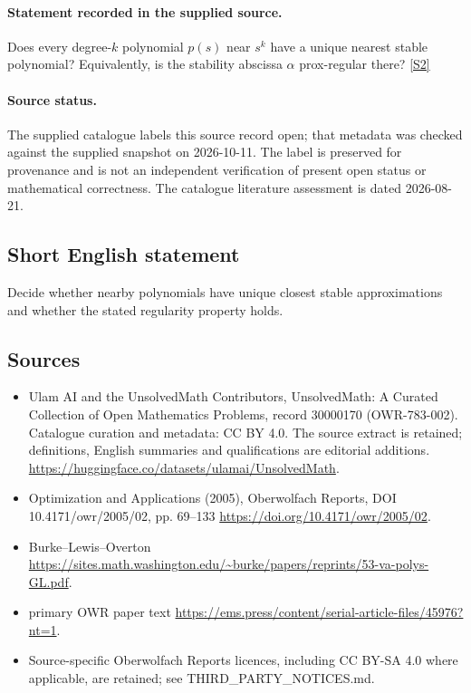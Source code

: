 \documentclass[11pt]{article}
\begin{document}
\paragraph{Statement recorded in the supplied source.}
Does every degree-$k$ polynomial $p(s)$ near $s^k$ have a unique nearest stable polynomial? Equivalently, is the stability abscissa $\alpha$ prox-regular there? \href{https://doi.org/10.4171/owr/2005/02}{[S2]}
\paragraph{Source status.}
The supplied catalogue labels this source record open; that metadata was checked against the supplied snapshot on 2026-10-11. The label is preserved for provenance and is not an independent verification of present open status or mathematical correctness. The catalogue literature assessment is dated 2026-08-21.
\subsection{Short English statement}
Decide whether nearby polynomials have unique closest stable approximations and whether the stated regularity property holds.
\subsection{Sources}
\begin{itemize}
\item[S1] Ulam AI and the UnsolvedMath Contributors, UnsolvedMath: A Curated Collection of Open Mathematics Problems, record 30000170 (OWR-783-002). Catalogue curation and metadata: CC BY 4.0. The source extract is retained; definitions, English summaries and qualifications are editorial additions.
\url{https://huggingface.co/datasets/ulamai/UnsolvedMath}.
\item[S2] Optimization and Applications (2005), Oberwolfach Reports, DOI 10.4171/owr/2005/02, pp. 69--133
\url{https://doi.org/10.4171/owr/2005/02}.
\item[S3] Burke--Lewis--Overton
\url{https://sites.math.washington.edu/~burke/papers/reprints/53-va-polys-GL.pdf}.
\item[S4] primary OWR paper text
\url{https://ems.press/content/serial-article-files/45976?nt=1}.
\item Source-specific Oberwolfach Reports licences, including CC BY-SA 4.0 where applicable, are retained; see THIRD\_PARTY\_NOTICES.md.
\end{itemize}
\end{document}
